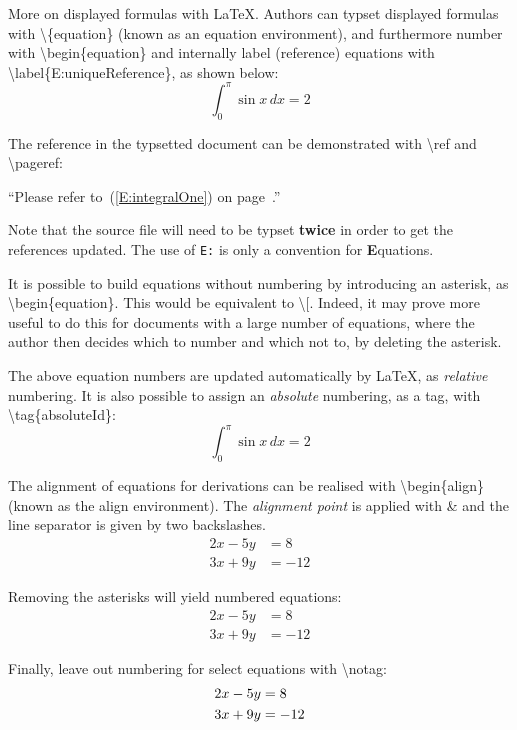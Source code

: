 \documentclass{sample}
\begin{document}
More on displayed formulas with LaTeX. Authors can typset displayed formulas with \textbackslash \{equation\} (known as an equation environment), and furthermore number with \textbackslash begin\{equation\} and internally label (reference) equations with \textbackslash label\{E:uniqueReference\}, as shown below:
\begin{equation}\label{E:integralOne}
\int_0^{\pi} \sin x \, dx = 2
\end{equation}

The reference in the typsetted document can be demonstrated with \textbackslash ref and \textbackslash pageref: 

``Please refer to~(\ref{E:integralOne}) on page~\pageref{E:integralOne}.''

Note that the source file will need to be typset \textbf{twice} in order to get the references updated. The use of \texttt{E:} is only a convention for \textbf{E}quations.

It is possible to build equations without numbering by introducing an asterisk, as \textbackslash begin\{equation\textasteriskcentered\}. This would be equivalent to \textbackslash [. Indeed, it may prove more useful to do this for documents with a large number of equations, where the author then decides which to number and which not to, by deleting the asterisk.

The above equation numbers are updated automatically by LaTeX, as \textit{relative} numbering. It is also possible to assign an \textit{absolute} numbering, as a tag, with \textbackslash tag\{absoluteId\}:
\begin{equation}
\int_0^{\pi} \sin x \, dx = 2 \tag{intOne}
\end{equation}

The alignment of equations for derivations can be realised with \textbackslash begin\{align\} (known as the align environment). The \textit{alignment point} is applied with \& and the line separator is given by two backslashes.
\begin{align*} 
2x - 5y &=  8 \\ 
3x + 9y &=  -12
\end{align*}

Removing the asterisks will yield numbered equations:
\begin{align} 
2x - 5y &=  8 \\ 
3x + 9y &=  -12
\end{align}

Finally, leave out numbering for select equations with \textbackslash notag:
\begin{align} 
2x - 5y &=  8 \notag \\ 
3x + 9y &=  -12
\end{align}
\end{document}
